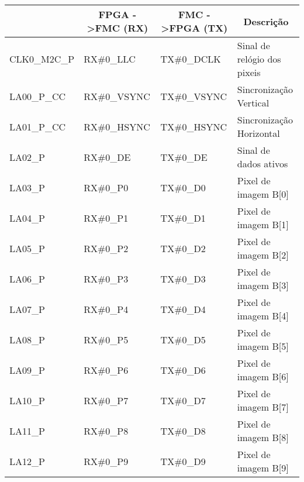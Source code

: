 \begin{longtable}[h!]
	{@{}llll@{}}
	
		\hline
		\centering	
		\multicolumn{1}{c}{\textbf{PORTA}} & \multicolumn{1}{c}{\textbf{FPGA -\textgreater FMC (RX)}} & \multicolumn{1}{c}{\textbf{FMC -\textgreater FPGA (TX)}} & \multicolumn{1}{c}{\textbf{Descrição}} \\ \hline \endhead
		CLK0\_M2C\_P & RX\#0\_LLC                           & TX\#0\_DCLK                        & Sinal de relógio dos pixeis         \\ 
		LA00\_P\_CC  & RX\#0\_VSYNC                         & TX\#0\_VSYNC                       & Sincronização Vertical          \\ 
		LA01\_P\_CC  & RX\#0\_HSYNC                         & TX\#0\_HSYNC                       & Sincronização Horizontal        \\ 
		LA02\_P      & RX\#0\_DE                            & TX\#0\_DE                          & Sinal de dados ativos    \\ 
		LA03\_P      & RX\#0\_P0                            & TX\#0\_D0                          & Pixel de imagem B{[}0{]} \\ 
		LA04\_P      & RX\#0\_P1                            & TX\#0\_D1                          & Pixel de imagem B{[}1{]} \\ 
		LA05\_P      & RX\#0\_P2                            & TX\#0\_D2                          & Pixel de imagem B{[}2{]} \\ 
		LA06\_P      & RX\#0\_P3                            & TX\#0\_D3                          & Pixel de imagem B{[}3{]} \\ 
		LA07\_P      & RX\#0\_P4                            & TX\#0\_D4                          & Pixel de imagem B{[}4{]} \\ 
		LA08\_P      & RX\#0\_P5                            & TX\#0\_D5                          & Pixel de imagem B{[}5{]} \\ 
		LA09\_P      & RX\#0\_P6                            & TX\#0\_D6                          & Pixel de imagem B{[}6{]} \\ 
		LA10\_P      & RX\#0\_P7                            & TX\#0\_D7                          & Pixel de imagem B{[}7{]} \\ 
		LA11\_P      & RX\#0\_P8                            & TX\#0\_D8                          & Pixel de imagem B{[}8{]} \\ 
		LA12\_P      & RX\#0\_P9                            & TX\#0\_D9                          & Pixel de imagem B{[}9{]} \\ 

\end{longtable}
